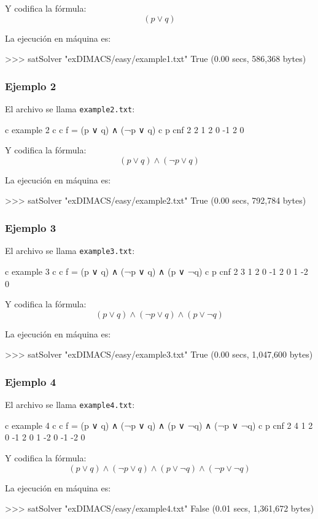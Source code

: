 Y codifica la fórmula:
$$(p \vee q)$$

La ejecución en máquina es:
\begin{code}
>>> satSolver "exDIMACS/easy/example1.txt"
True
(0.00 secs, 586,368 bytes)
\end{code}
\newpage
\subsubsection{Ejemplo 2}
El archivo se llama \texttt{example2.txt}:
\begin{codigo}
c example 2
c 
c f = (p ∨ q) ∧ (¬p ∨ q)
c
p cnf 2 2
1 2 0
-1 2 0
\end{codigo}

Y codifica la fórmula:
$$(p \vee q) \wedge (\neg p \vee q)$$

La ejecución en máquina es:
\begin{code}
>>> satSolver "exDIMACS/easy/example2.txt"
True
(0.00 secs, 792,784 bytes)
\end{code}
\subsubsection{Ejemplo 3}
El archivo se llama \texttt{example3.txt}:
\begin{codigo}
c example 3
c 
c f = (p ∨ q) ∧ (¬p ∨ q) ∧ (p ∨ ¬q)
c
p cnf 2 3
1 2 0
-1 2 0
1 -2 0
\end{codigo}

Y codifica la fórmula:
$$(p \vee q)\wedge (\neg p \vee q)\wedge ( p \vee \neg q)$$

La ejecución en máquina es:
\begin{code}
>>> satSolver "exDIMACS/easy/example3.txt"
True
(0.00 secs, 1,047,600 bytes)
\end{code}
\subsubsection{Ejemplo 4}
El archivo se llama \texttt{example4.txt}:
\begin{codigo}
c example 4
c 
c f = (p ∨ q) ∧ (¬p ∨ q) ∧ (p ∨ ¬q) ∧ (¬p ∨ ¬q)
c
p cnf 2 4
1 2 0
-1 2 0
1 -2 0
-1 -2 0
\end{codigo}

Y codifica la fórmula:
$$(p \vee q)\wedge (\neg p \vee q)\wedge ( p \vee \neg q)\wedge (\neg p \vee \neg q)$$

La ejecución en máquina es:
\begin{code}
>>> satSolver "exDIMACS/easy/example4.txt"
False
(0.01 secs, 1,361,672 bytes)
\end{code}

